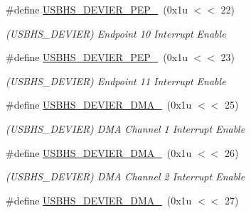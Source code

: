 \begin{DoxyCompactItemize}
\mbox{\label{group__SAME70__USBHS_ga21412998dd56cc4408626fb2c98cadd8}} 
\#define \mbox{\hyperlink{group__SAME70__USBHS_ga21412998dd56cc4408626fb2c98cadd8}{U\+S\+B\+H\+S\+\_\+\+D\+E\+V\+I\+E\+R\+\_\+\+P\+E\+P\+\_}}~(0x1u $<$$<$ 22)
\begin{DoxyCompactList}\small\item\em (U\+S\+B\+H\+S\+\_\+\+D\+E\+V\+I\+ER) Endpoint 10 Interrupt Enable \end{DoxyCompactList}\item 
\mbox{\label{group__SAME70__USBHS_gaef695cfb4079c68f92a05817e9885dec}} 
\#define \mbox{\hyperlink{group__SAME70__USBHS_gaef695cfb4079c68f92a05817e9885dec}{U\+S\+B\+H\+S\+\_\+\+D\+E\+V\+I\+E\+R\+\_\+\+P\+E\+P\+\_}}~(0x1u $<$$<$ 23)
\begin{DoxyCompactList}\small\item\em (U\+S\+B\+H\+S\+\_\+\+D\+E\+V\+I\+ER) Endpoint 11 Interrupt Enable \end{DoxyCompactList}\item 
\mbox{\label{group__SAME70__USBHS_ga818377ea55b0df1a3425ecd4a75d93b3}} 
\#define \mbox{\hyperlink{group__SAME70__USBHS_ga818377ea55b0df1a3425ecd4a75d93b3}{U\+S\+B\+H\+S\+\_\+\+D\+E\+V\+I\+E\+R\+\_\+\+D\+M\+A\+\_}}~(0x1u $<$$<$ 25)
\begin{DoxyCompactList}\small\item\em (U\+S\+B\+H\+S\+\_\+\+D\+E\+V\+I\+ER) D\+MA Channel 1 Interrupt Enable \end{DoxyCompactList}\item 
\mbox{\label{group__SAME70__USBHS_ga77e6f737a9a0d19a659faebd731f5efe}} 
\#define \mbox{\hyperlink{group__SAME70__USBHS_ga77e6f737a9a0d19a659faebd731f5efe}{U\+S\+B\+H\+S\+\_\+\+D\+E\+V\+I\+E\+R\+\_\+\+D\+M\+A\+\_}}~(0x1u $<$$<$ 26)
\begin{DoxyCompactList}\small\item\em (U\+S\+B\+H\+S\+\_\+\+D\+E\+V\+I\+ER) D\+MA Channel 2 Interrupt Enable \end{DoxyCompactList}\item 
\mbox{\label{group__SAME70__USBHS_ga6022a0b8ecbc042bd7efd4d85460946a}} 
\#define \mbox{\hyperlink{group__SAME70__USBHS_ga6022a0b8ecbc042bd7efd4d85460946a}{U\+S\+B\+H\+S\+\_\+\+D\+E\+V\+I\+E\+R\+\_\+\+D\+M\+A\+\_}}~(0x1u $<$$<$ 27)
$$
\end{DoxyCompactItemize}
